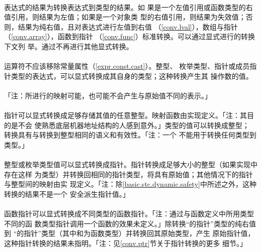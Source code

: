 \paragraph{}
表达式的结果为转换表达式到类型的结果。如
果是一个左值引用或函数类型的右值引用，则结果为左值；如果是一个对象类
型的右值引用，则结果为失效值；否则，结果为纯右值，且对表达式进行左值到右值
（\ref{conv.lval}），数组与指针（\ref{conv.array}），函数到指针
（\ref{conv.func}）标准转换。可以通过显式进行的转换下文列
举。通过不再进行其他显式转换。

\paragraph{}
运算符不应该移除常量属性（\ref{expr.const.cast}）。整型、
枚举类型、指针或成员指针类型的表达式，可以显式转换成其自身的类型；这种转换产生其
操作数的值。

\paragraph{}
「注：所进行的映射可能，也可能不会产生与原始值不同的表示。」

\paragraph{}
指针可以显式转换成足够存储其值的任意整型。映射函数由实现定义。「注：其目的是不会
使熟悉底层机器地址结构的人感到意外。」类型的值可以转换成整型；
转换具有与转换到整型相同的语义和有效性。「注：一个
不能用于转换任何类型到类型。」

\paragraph{}
整型或枚举类型值可以显式转换成指针。指针转换成足够大小的整型（如果实现中存在这样
为类型）并转换回相同的指针类型，将具有原始值；其他情况下的指针与整型间的映射由实
现定义。「注：除\ref{basic.stc.dynamic.safety}中所述之外，这种转换的结果不是一个
安全派生指针值。」

\paragraph{}
函数指针可以显式转换成不同类型的函数指针。「注：通过与函数定义中所用类型不同的函
数类型指针调用一个函数的效果未定义。」除转换``的指针''类型的纯右值到
``的指针''类型（其中和为函数类型）并转换回其原始类型，产生
原始指针值，这种指针转换的结果未指明。「注：见\ref{conv.ptr}节关于指针转换的更多
细节。」


